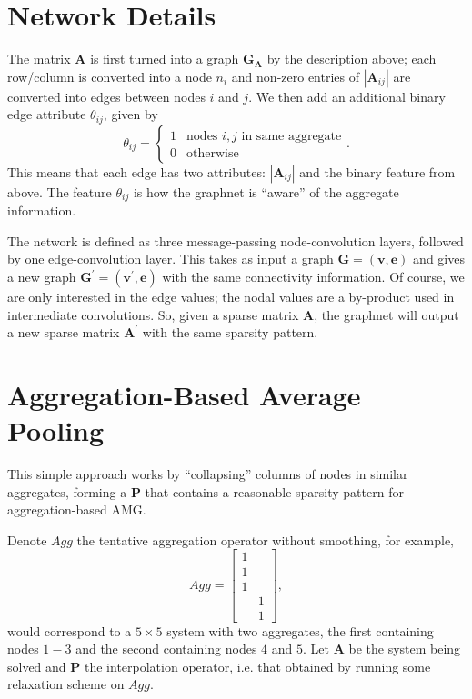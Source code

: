 \documentclass{article}
\newcommand{\abs}[1]{\left\lvert#1\right\rvert}
\newcommand{\mat}[1]{\bm{{#1}}}
\renewcommand{\vec}[1]{\bm{{#1}}}
\begin{document}
\section{Network Details}\label{sec:graphnet}
The matrix $\mat{A}$ is first turned into a graph $\mat{G}_{\mat{A}}$ by the description above; each row/column is converted into a node $n_i$ and non-zero entries of $\abs{\mat{A}_{ij}}$ are converted into edges between nodes $i$ and $j$.  We then add an additional binary edge attribute $\theta_{ij}$, given by
\begin{equation}
  \theta_{ij} = \begin{cases} 1 & \text{nodes } i,j \text{ in same aggregate} \\ 0 & \text{otherwise} \end{cases}.
\end{equation}
This means that each edge has two attributes: $\abs{\mat{A}_{ij}}$ and the binary feature from above.  The feature $\theta_{ij}$ is how the graphnet is ``aware'' of the aggregate information.

The network is defined as three message-passing node-convolution layers, followed by one edge-convolution layer.  This takes as input a graph $\mat{G} = \left(\vec{v}, \vec{e}\right)$ and gives a new graph $\mat{G}^\prime = \left(\vec{v}^\prime, \vec{e}\right)$ with the same connectivity information.  Of course, we are only interested in the edge values; the nodal values are a by-product used in intermediate convolutions.  So, given a sparse matrix $\mat{A}$, the graphnet will output a new sparse matrix $\mat{A}^\prime$ with the same sparsity pattern.

\section{Aggregation-Based Average Pooling}\label{sec:avg_pooling}
This simple approach works by ``collapsing'' columns of nodes in similar aggregates, forming a $\mat{P}$ that contains a reasonable sparsity pattern for aggregation-based AMG.



Denote $Agg$ the tentative aggregation operator without smoothing, for example,
\begin{equation}
Agg =
\begin{bmatrix}
  1 & \\
  1 & \\
  1 & \\
  & 1 \\
  & 1
\end{bmatrix},
\end{equation}
would correspond to a $5 \times 5$ system with two aggregates, the first containing nodes $1-3$ and the second containing nodes $4$ and $5$.  Let $\mat{A}$ be the system being solved and $\mat{P}$ the interpolation operator, i.e. that obtained by running some relaxation scheme on $Agg$.
\end{document}
